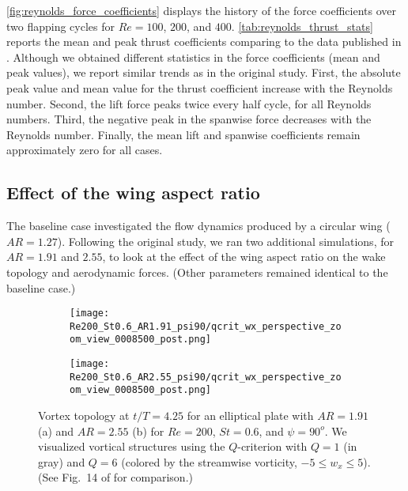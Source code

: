 \cref{fig:reynolds_force_coefficients} displays the history of the force coefficients over two flapping cycles for $Re =100$, $200$, and $400$.
\cref{tab:reynolds_thrust_stats} reports the mean and peak thrust coefficients comparing to the data published in \citet{li_dong_2016}.
Although we obtained different statistics in the force coefficients (mean and peak values), we report similar trends as in the original study.
First, the absolute peak value and mean value for the thrust coefficient increase with the Reynolds number.
Second, the lift force peaks twice every half cycle, for all Reynolds numbers.
Third, the negative peak in the spanwise force decreases with the Reynolds number.
Finally, the mean lift and spanwise coefficients remain approximately zero for all cases.

\subsection{Effect of the wing aspect ratio}

The baseline case investigated the flow dynamics produced by a circular wing ($AR = 1.27$).
Following the original study, we ran two additional simulations, for $AR = 1.91$ and $2.55$, to look at the effect of the wing aspect ratio on the wake topology and aerodynamic forces.
(Other parameters remained identical to the baseline case.)

\begin{figure}[!h]
  \centering
  \begin{subfigure}[c]{0.45\textwidth}
    \centering
    \texttt{[image: Re200\_St0.6\_AR1.91\_psi90/qcrit\_wx\_perspective\_zoom\_view\_0008500\_post.png]}
    \caption{}
    \label{fig:ratio_wake_topology:1.91_perspective}
  \end{subfigure}
  \hfill
  \begin{subfigure}[c]{0.45\textwidth}
    \centering
    \texttt{[image: Re200\_St0.6\_AR2.55\_psi90/qcrit\_wx\_perspective\_zoom\_view\_0008500\_post.png]}
    \caption{}
    \label{fig:ratio_wake_topology:2.55_perspective}
  \end{subfigure}
  \caption{Vortex topology at $t / T = 4.25$ for an elliptical plate with $AR = 1.91$ (a) and $AR = 2.55$ (b) for $Re = 200$, $St = 0.6$, and $\psi = 90^o$. We visualized vortical structures using the $Q$-criterion with $Q = 1$ (in gray) and $Q = 6$ (colored by the streamwise vorticity, $-5 \leq w_x \leq 5$). (See Fig.~14 of \citet{li_dong_2016} for comparison.)}
  \label{fig:ratio_wake_topology}
\end{figure}

